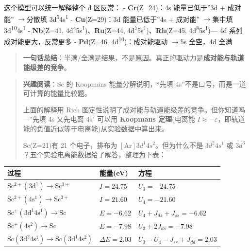 \documentclass[a4paper,11pt]{ctexart}
\newcounter{none}
\newcommand{\箭}{\ensuremath{\rightarrow}}
\newcommand{\左箭}{\ensuremath{\leftarrow}}
\newcommand{\上箭}{\ensuremath{\uparrow}}
\newcommand{\下箭}{\ensuremath{\downarrow}}
\newcommand{\衡}{\ensuremath{\rightleftharpoons}}
\newcommand{\双箭}{\ensuremath{\leftrightarrow}}
\newcommand{\约等于}{\ensuremath{\approx}}
\newcommand{\小于等于}{\ensuremath{\leq}}
\newcommand{\大于等于}{\ensuremath{\geq}}
\newcommand{\不等于}{\ensuremath{\neq}}
\newcommand{\西格马}{\ensuremath{\sigma}}
\newcommand{\派}{\ensuremath{\pi}}
\begin{document}
这个模型可以统一解释整个 d 区反常：
- \textbf{Cr}(Z=24)：4s 能量已低于''3d + 成对能'' \箭 分散填 3d\textsuperscript{5}4s\textsuperscript{1}
- \textbf{Cu}(Z=29)：3d 能量已低于''4s + 成对能'' \箭 集中填 3d\textsuperscript{10}4s\textsuperscript{1}
- \textbf{Nb}(Z=41, 4d\textsuperscript{4}5s\textsuperscript{1})、\textbf{Ru}(Z=44, 4d\textsuperscript{7}5s\textsuperscript{1})、\textbf{Rh}(Z=45, 4d\textsuperscript{8}5s\textsuperscript{1})--- 4d 系列成对能更大，反常更多
- \textbf{Pd}(Z=46, 4d\textsuperscript{10})：成对能驱动 \箭 5s 全空，4d 全满

\begin{quote}
\textbf{一句话总结}：半满/全满是结果，不是原因。真正的驱动力是\textbf{成对能与轨道能级差的竞争}。
\end{quote}

\begin{quote}
\textbf{兴趣阅读}：Sc 的 Koopmans 能量分解说明，``先填 4s''不是口号，而是一道可计算的能量比较题。

上面的解释用 Rich 图定性说明了成对能与轨道能级差的竞争。但你知道吗---"先填 4s 又先电离 4s" 可以用 \textbf{Koopmans 定理}(电离能 \(I \approx -\varepsilon\)，即轨道能的负值近似等于电离能)从实验数据中算出来。

Sc(Z=21)有 21 个电子，排布为 \([\mathrm{Ar}]3d^1 4s^2\)。但为什么不是 \(3d^2 4s^1\) 或 \(3d^3\)？五个实验电离能数据给了解答，整理为下表：
\end{quote}

{\def\LTcaptype{none} %
\begin{longtable}[]{@{}
  >{\raggedright\arraybackslash}p{}
  >{\centering\arraybackslash}p{}
  >{\raggedright\arraybackslash}p{}@{}}
\toprule\noalign{}
\begin{minipage}[b]{\linewidth}\raggedright
过程
\end{minipage} & \begin{minipage}[b]{\linewidth}\centering
能量(eV)
\end{minipage} & \begin{minipage}[b]{\linewidth}\raggedright
方程
\end{minipage} \\
\midrule\noalign{}
\endhead
\bottomrule\noalign{}
\endlastfoot
\(\mathrm{Sc^{2+}(3d^1) \rightarrow Sc^{3+}}\) & \(I = 24.75\) & \(U_3 = -24.75\) \\
\(\mathrm{Sc^{2+}(4s^1) \rightarrow Sc^{3+}}\) & \(I = 21.60\) & \(U_4 = -21.60\) \\
\(\mathrm{Sc^{+}(3d^1 4s^1) \rightarrow Sc}\) & \(E = -6.62\) & \(U_4 + J_{ds} + J_{ss} = -6.62\) \\
\(\mathrm{Sc^{+}(4s^2) \rightarrow Sc}\) & \(E = -7.98\) & \(U_3 + 2J_{ds} = -7.98\) \\
\(\mathrm{Sc(3d^2 4s^1) \rightarrow Sc(3d^1 4s^2)}\) & \(\Delta E = 2.03\) & \(U_3 - U_4 - J_{ss} + J_{dd} = 2.03\) \\
\end{longtable}
}
\end{document}
